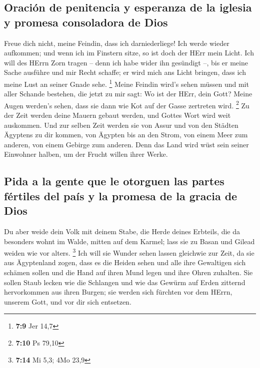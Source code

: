 \hypertarget{oraciuxf3n-de-penitencia-y-esperanza-de-la-iglesia-y-promesa-consoladora-de-dios}{%
\subsection{Oración de penitencia y esperanza de la iglesia y promesa
consoladora de
Dios}\label{oraciuxf3n-de-penitencia-y-esperanza-de-la-iglesia-y-promesa-consoladora-de-dios}}

 Freue dich nicht, meine Feindin, dass ich darniederliege!
Ich werde wieder aufkommen; und wenn ich im Finstern sitze, so ist doch
der HErr mein Licht.  Ich will des HErrn Zorn tragen --
denn ich habe wider ihn gesündigt --, bis er meine Sache ausführe und
mir Recht schaffe; er wird mich ans Licht bringen, dass ich meine Lust
an seiner Gnade sehe. \footnote{\textbf{7:9} Jer 14,7} 
Meine Feindin wird's sehen müssen und mit aller Schande bestehen, die
jetzt zu mir sagt: Wo ist der HErr, dein Gott? Meine Augen werden's
sehen, dass sie dann wie Kot auf der Gasse zertreten wird. \footnote{\textbf{7:10}
  Ps 79,10}  Zu der Zeit werden deine Mauern gebaut
werden, und Gottes Wort wird weit auskommen.  Und zur
selben Zeit werden sie von Assur und von den Städten Ägyptens zu dir
kommen, von Ägypten bis an den Strom, von einem Meer zum anderen, von
einem Gebirge zum anderen.  Denn das Land wird wüst sein
seiner Einwohner halben, um der Frucht willen ihrer Werke.

\hypertarget{pida-a-la-gente-que-le-otorguen-las-partes-fuxe9rtiles-del-pauxeds-y-la-promesa-de-la-gracia-de-dios}{%
\subsection{Pida a la gente que le otorguen las partes fértiles del país
y la promesa de la gracia de
Dios}\label{pida-a-la-gente-que-le-otorguen-las-partes-fuxe9rtiles-del-pauxeds-y-la-promesa-de-la-gracia-de-dios}}

 Du aber weide dein Volk mit deinem Stabe, die Herde
deines Erbteils, die da besonders wohnt im Walde, mitten auf dem Karmel;
lass sie zu Basan und Gilead weiden wie vor alters. \footnote{\textbf{7:14}
  Mi 5,3; 4Mo 23,9}  Ich will sie Wunder sehen lassen
gleichwie zur Zeit, da sie aus Ägyptenland zogen,  dass
es die Heiden sehen und alle ihre Gewaltigen sich schämen sollen und die
Hand auf ihren Mund legen und ihre Ohren zuhalten.  Sie
sollen Staub lecken wie die Schlangen und wie das Gewürm auf Erden
zitternd hervorkommen aus ihren Burgen; sie werden sich fürchten vor dem
HErrn, unserem Gott, und vor dir sich entsetzen.

